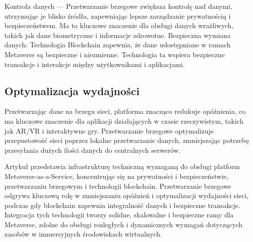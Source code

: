 Kontrola danych --- Przetwarzanie brzegowe zwiększa kontrolę nad danymi, utrzymując je blisko źródła, zapewniając lepsze zarządzanie prywatnością i bezpieczeństwem. Ma to kluczowe znaczenie dla obsługi danych wrażliwych, takich jak dane biometryczne i informacje zdrowotne.
Bezpieczna wymiana danych: Technologia Blockchain zapewnia, że dane udostępniane w ramach Metaverse są bezpieczne i niezmienne. Technologia ta wspiera bezpieczne transakcje i interakcje między użytkownikami i aplikacjami.

\subsection{Optymalizacja wydajności}

Przetwarzając dane na brzegu sieci, platforma znacząco redukuje opóźnienia, co ma kluczowe znaczenie dla aplikacji działających w czasie rzeczywistym, takich jak AR/VR i interaktywne gry.
Przetwarzanie brzegowe optymalizuje przepustowość sieci poprzez lokalne przetwarzanie danych, zmniejszając potrzebę przesyłania dużych ilości danych do centralnych serwerów.

Artykuł przedstawia infrastrukturę techniczną wymaganą do obsługi platform Metaverse-as-a-Service, koncentrując się na prywatności i bezpieczeństwie, przetwarzaniu brzegowym i technologii blockchain. Przetwarzanie brzegowe odgrywa kluczową rolę w zmniejszaniu opóźnień i optymalizacji wydajności sieci, podczas gdy blockchain zapewnia integralność danych i bezpieczne transakcje. Integracja tych technologii tworzy solidne, skalowalne i bezpieczne ramy dla Metaverse, zdolne do obsługi rozległych i dynamicznych wymagań dotyczących zasobów w immersyjnych środowiskach wirtualnych.
